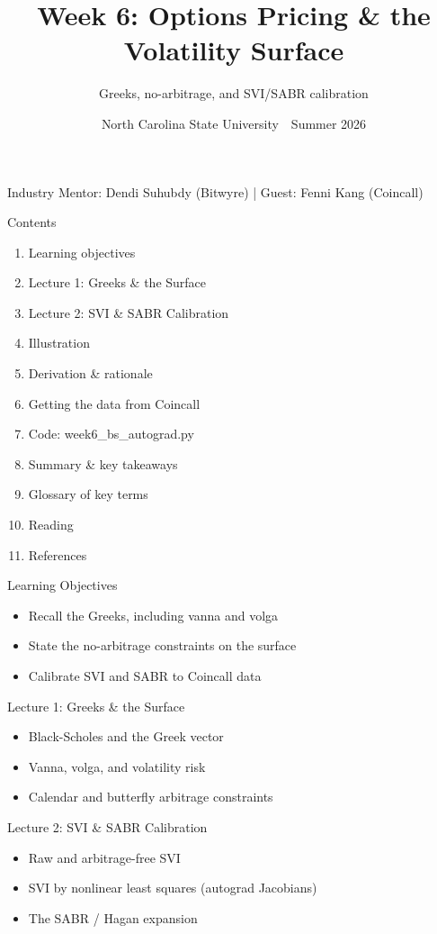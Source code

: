 \documentclass[aspectratio=169,10pt]{beamer}
\title{Week 6: Options Pricing \& the Volatility Surface}
\subtitle{Greeks, no-arbitrage, and SVI/SABR calibration}
\date{North Carolina State University \,\textbar\, Summer 2026}
\begin{document}
\begin{frame}[plain]\titlepage\begin{center}\tiny Industry Mentor: Dendi Suhubdy (Bitwyre)  |  Guest: Fenni Kang (Coincall)\end{center}\end{frame}
\begin{frame}{Contents}
\small\begin{enumerate}\setlength{\itemsep}{3pt}
  \item Learning objectives
  \item Lecture 1: Greeks \& the Surface
  \item Lecture 2: SVI \& SABR Calibration
  \item Illustration
  \item Derivation \& rationale
  \item Getting the data from Coincall
  \item Code: week6\_bs\_autograd.py
  \item Summary \& key takeaways
  \item Glossary of key terms
  \item Reading
  \item References
\end{enumerate}
\end{frame}

\begin{frame}{Learning Objectives}
\begin{itemize}
  \item Recall the Greeks, including vanna and volga
  \item State the no-arbitrage constraints on the surface
  \item Calibrate SVI and SABR to Coincall data
\end{itemize}
\end{frame}

\begin{frame}{Lecture 1: Greeks \& the Surface}
\begin{itemize}
  \item Black-Scholes and the Greek vector
  \item Vanna, volga, and volatility risk
  \item Calendar and butterfly arbitrage constraints
\end{itemize}
\end{frame}

\begin{frame}{Lecture 2: SVI \& SABR Calibration}
\begin{itemize}
  \item Raw and arbitrage-free SVI
  \item SVI by nonlinear least squares (autograd Jacobians)
  \item The SABR / Hagan expansion
\end{itemize}
\end{frame}
\end{document}
